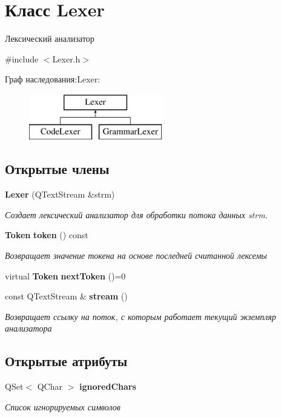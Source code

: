 \section{Класс \-Lexer}
\label{classLexer}


Лексический анализатор  




{\ttfamily \#include $<$\-Lexer.\-h$>$}

Граф наследования\-:\-Lexer\-:\begin{figure}[H]
\begin{center}
\leavevmode
\includegraphics[height=2.000000cm]{classLexer}
\end{center}
\end{figure}
\subsection*{Открытые члены}
\begin{DoxyCompactItemize}
\item 
{\bf \-Lexer} (\-Q\-Text\-Stream \&strm)
\begin{DoxyCompactList}\small\item\em Создает лексический анализатор для обработки потока данных {\itshape strm\/}. \end{DoxyCompactList}\item 
{\bf \-Token} {\bf token} () const 
\begin{DoxyCompactList}\small\item\em Возвращает значение токена на основе последней считанной лексемы \end{DoxyCompactList}\item 
virtual {\bf \-Token} {\bfseries next\-Token} ()=0\label{classLexer_aefb597575e35cf11b0c207b4c279b26c}

\item 
const \-Q\-Text\-Stream \& {\bf stream} ()
\begin{DoxyCompactList}\small\item\em Возвращает ссылку на поток, с которым работает текущий экземпляр анализатора \end{DoxyCompactList}\end{DoxyCompactItemize}
\subsection*{Открытые атрибуты}
\begin{DoxyCompactItemize}
\item 
\-Q\-Set$<$ \-Q\-Char $>$ {\bf ignored\-Chars}\label{classLexer_aeeca22b6d3c00718ce6a6efdeecaf26c}

\begin{DoxyCompactList}\small\item\em Список игнорируемых символов \end{DoxyCompactList}\end{DoxyCompactItemize}
